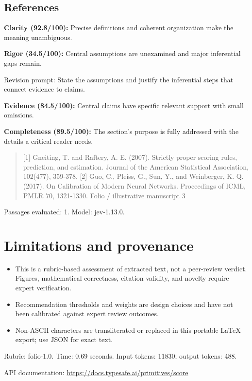 \documentclass[11pt]{article}
\begin{document}
\subsection{References}
\par\textbf{Clarity (92.8/100):} Precise definitions and coherent organization make the meaning unambiguous.
\par\textbf{Rigor (34.5/100):} Central assumptions are unexamined and major inferential gaps remain.
\par Revision prompt: State the assumptions and justify the inferential steps that connect evidence to claims.
\par\textbf{Evidence (84.5/100):} Central claims have specific relevant support with small omissions.
\par\textbf{Completeness (89.5/100):} The section's purpose is fully addressed with the details a critical reader needs.
\begin{quote}\small [1] Gneiting, T. and Raftery, A. E. (2007). Strictly proper scoring rules, prediction, and estimation. Journal
of the American Statistical Association, 102(477), 359-378.
[2] Guo, C., Pleiss, G., Sun, Y., and Weinberger, K. Q. (2017). On Calibration of Modern Neural
Networks. Proceedings of ICML, PMLR 70, 1321-1330.
Folio / illustrative manuscript                                      3\end{quote}
Passages evaluated: 1. Model: jev-1.13.0.
\section{Limitations and provenance}
\begin{itemize}
\item This is a rubric-based assessment of extracted text, not a peer-review verdict. Figures, mathematical correctness, citation validity, and novelty require expert verification.
\item Recommendation thresholds and weights are design choices and have not been calibrated against expert review outcomes.
\item Non-ASCII characters are transliterated or replaced in this portable LaTeX export; use JSON for exact text.
\end{itemize}
Rubric: folio-1.0. Time: 0.69 seconds. Input tokens: 11830; output tokens: 488.
\par API documentation: \url{https://docs.typesafe.ai/primitives/score}
\end{document}
